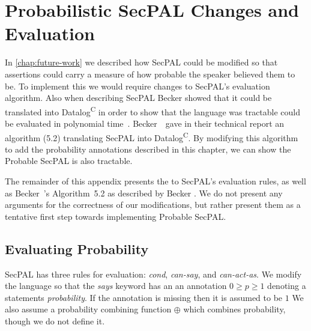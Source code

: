 
\chapter{Probabilistic SecPAL Changes and Evaluation}
\label{appendix:probabilistic}

In \autoref{chap:future-work} we described how SecPAL could be modified so that
assertions could carry a measure of how probable the speaker believed them to
be. To implement this we would require changes to SecPAL's evaluation algorithm.
Also when describing SecPAL Becker showed that it could be translated into
Datalog\textsuperscript{C} in order to show that the language was tractable
could be evaluated in polynomial time~\cite{becker_secpal:_2006}.
Becker~\etal~gave in their technical report an algorithm (5.2) translating
SecPAL into Datalog\textsuperscript{C}. By modifying this algorithm to add the
probability annotations described in this chapter, we can show the Probable
SecPAL is also tractable.

 The remainder of this appendix presents the  to SecPAL's
evaluation rules, as well as Becker~\etal{}'s Algorithm~5.2 \textsf{as described
by Becker }. We do not present any
arguments for the correctness of our modifications, but rather present them as a
tentative first step towards implementing Probable SecPAL.

\section{Evaluating Probability}

SecPAL has three rules for evaluation: \emph{cond}, \emph{can-say},
and \emph{can-act-as}.  We modify the language so that the \emph{says}
keyword has an an annotation $0 \geq p \geq 1$ denoting a statements
\emph{probability}.  If the annotation is missing then it is assumed
to be $1$ We also assume a probability combining function $\oplus$
which combines probability, though we do not define it.

